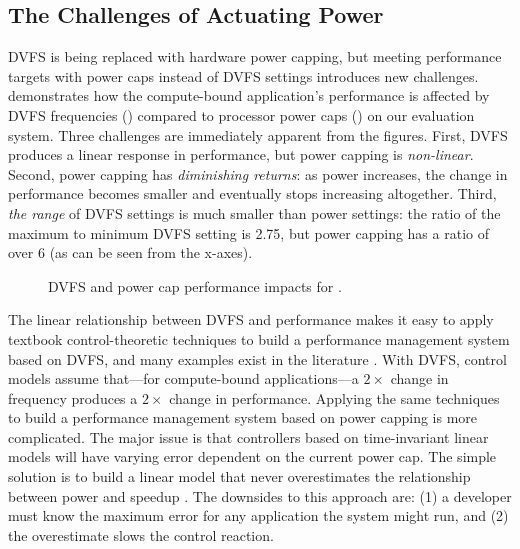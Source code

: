 \subsection{The Challenges of Actuating Power}
\label{sec:copper-motivation-power}

DVFS is being replaced with hardware power capping, but meeting performance targets with power caps instead of DVFS settings introduces new challenges.
 demonstrates how the compute-bound  application's performance is affected by DVFS frequencies () compared to processor power caps () on our evaluation system.
Three challenges are immediately apparent from the figures.
First, DVFS produces a linear response in performance, but power capping is \emph{non-linear}.
Second, power capping has \emph{diminishing returns}: as power increases, the change in performance becomes smaller and eventually stops increasing altogether.
Third, \emph{the range} of DVFS settings is much smaller than power settings: the ratio of the maximum to minimum DVFS setting is 2.75, but power capping has a ratio of over 6 (as can be seen from the x-axes).

\begin{figure}[t]
  \centering
  \subfloat[DVFS.]%
  {%
  \label{fig:copper-tradeoffs-vips-dvfs}}
  \hspace*{0.5cm}
  \caption{DVFS and power cap performance impacts for .}
  \label{fig:copper-tradeoffs-vips}
\end{figure}

The linear relationship between DVFS and performance makes it easy to apply textbook control-theoretic techniques to build a performance management system based on DVFS, and many examples exist in the literature \cite{ICSE2014,SWiFT,KaramanolisEtAl-2005a,lefurgy2008power,josep-isca2016,GRAPE,ControlWare}.
With DVFS, control models assume that---for compute-bound applications---a $2\times$ change in frequency produces a $2\times$ change in performance.
Applying the same techniques to build a performance management system based on power capping is more complicated.
The major issue is that controllers based on time-invariant linear models will have varying error dependent on the current power cap.
The simple solution is to build a linear model that never overestimates the relationship between power and speedup \cite{ICSE2014}.
The downsides to this approach are: (1) a developer must know the maximum error for any application the system might run, and (2) the overestimate slows the control reaction.

